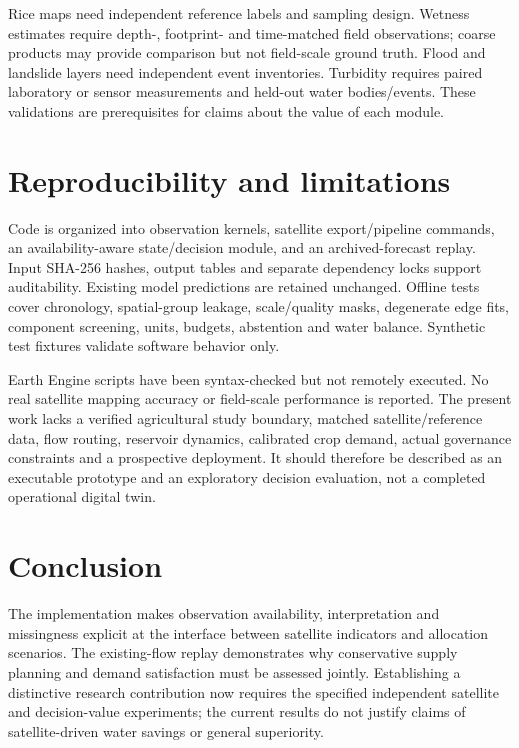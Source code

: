 \documentclass[11pt]{article}
\begin{document}
Rice maps need independent reference labels and sampling design. Wetness estimates require depth-, footprint- and time-matched field observations; coarse products may provide comparison but not field-scale ground truth. Flood and landslide layers need independent event inventories. Turbidity requires paired laboratory or sensor measurements and held-out water bodies/events. These validations are prerequisites for claims about the value of each module.

\section{Reproducibility and limitations}
Code is organized into observation kernels, satellite export/pipeline commands, an availability-aware state/decision module, and an archived-forecast replay. Input SHA-256 hashes, output tables and separate dependency locks support auditability. Existing model predictions are retained unchanged. Offline tests cover chronology, spatial-group leakage, scale/quality masks, degenerate edge fits, component screening, units, budgets, abstention and water balance. Synthetic test fixtures validate software behavior only.

Earth Engine scripts have been syntax-checked but not remotely executed. No real satellite mapping accuracy or field-scale performance is reported. The present work lacks a verified agricultural study boundary, matched satellite/reference data, flow routing, reservoir dynamics, calibrated crop demand, actual governance constraints and a prospective deployment. It should therefore be described as an executable prototype and an exploratory decision evaluation, not a completed operational digital twin.

\section{Conclusion}
The implementation makes observation availability, interpretation and missingness explicit at the interface between satellite indicators and allocation scenarios. The existing-flow replay demonstrates why conservative supply planning and demand satisfaction must be assessed jointly. Establishing a distinctive research contribution now requires the specified independent satellite and decision-value experiments; the current results do not justify claims of satellite-driven water savings or general superiority.
\end{document}
